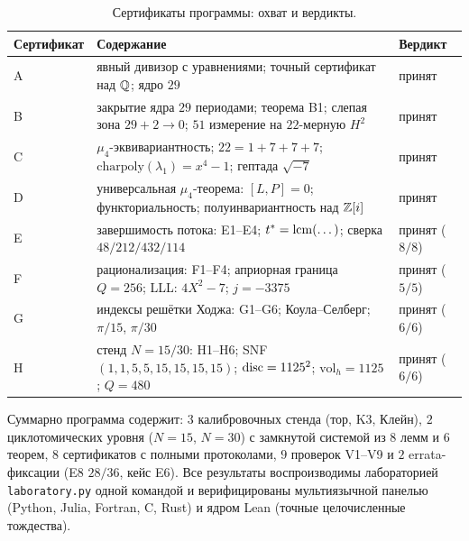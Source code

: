 \begin{table}[t]
\centering
\caption{Сертификаты программы: охват и вердикты.}
\label{tab:certs}
\small
\begin{tabularx}{\textwidth}{@{}l >{\raggedright\arraybackslash}X l@{}}
\toprule
Сертификат & Содержание & Вердикт \\
\midrule
A & явный дивизор с уравнениями; точный сертификат над $\mathbb{Q}$;
  ядро $29$ & принят \\
B & закрытие ядра $29$ периодами; теорема B1; слепая зона
  $29+2\to0$; $51$ измерение на $22$-мерную $H^2$ & принят \\
C & $\mu_4$-эквивариантность; $22=1+7+7+7$;
  $\mathrm{charpoly}(\lambda_1)=x^4-1$; гептада $\sqrt{-7}$ &
  принят \\
D & универсальная $\mu_4$-теорема: $[L,P]=0$; функториальность;
  полуинвариантность над $\mathbb{Z}[i]$ & принят \\
E & завершимость потока: E1--E4; $t^*=\operatorname{lcm}(\dots)$; сверка
  $48/212/432/114$ & принят ($8/8$) \\
F & рационализация: F1--F4; априорная граница $Q=256$; LLL:
  $4X^2-7$; $j=-3375$ & принят ($5/5$) \\
G & индексы решётки Ходжа: G1--G6; Коула--Селберг; $\pi/15$,
  $\pi/30$ & принят ($6/6$) \\
H & стенд $N=15/30$: H1--H6; SNF $(1,1,5,5,15,15,15,15)$;
  $\operatorname{disc}=1125^2$; $\mathrm{vol}_h=1125$; $Q=480$ &
  принят ($6/6$) \\
\bottomrule
\end{tabularx}
\end{table}

Суммарно программа содержит: $3$ калибровочных стенда (тор, K3,
Клейн), $2$ циклотомических уровня ($N=15$, $N=30$) с замкнутой
системой из $8$ лемм и $6$ теорем, $8$ сертификатов с полными
протоколами, $9$ проверок V1--V9 и $2$ errata-фиксации (E8 $28/36$,
кейс E6). Все результаты воспроизводимы лабораторией
\texttt{laboratory.py} одной командой и верифицированы
мультиязычной панелью (Python, Julia, Fortran, C, Rust) и ядром
Lean (точные целочисленные тождества).
